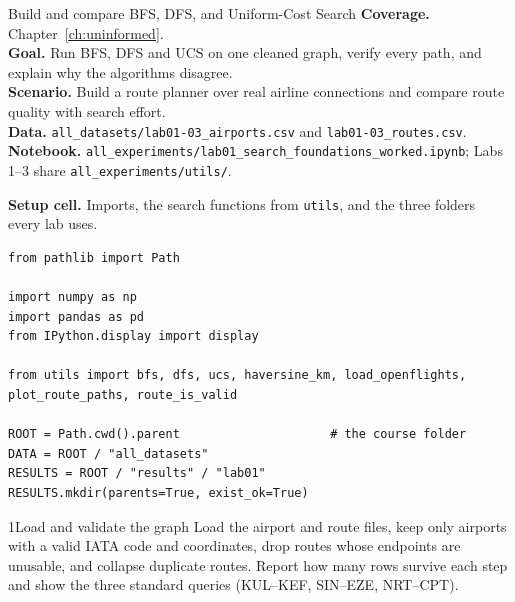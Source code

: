 
\begin{labproject}{Build and compare BFS, DFS, and Uniform-Cost Search}
\textbf{Coverage.} Chapter~\ref{ch:uninformed}.\\
\textbf{Goal.} Run BFS, DFS and UCS on one cleaned graph, verify every path, and explain why the algorithms disagree.\\
\textbf{Scenario.} Build a route planner over real airline connections and compare route quality with search effort.\\
\textbf{Data.} \texttt{all\_datasets/lab01-03\_airports.csv} and \texttt{lab01-03\_routes.csv}.\\
\textbf{Notebook.} \texttt{all\_experiments/lab01\_search\_foundations\_worked.ipynb}; Labs 1--3 share \texttt{all\_experiments/utils/}.
\end{labproject}

\noindent\textbf{Setup cell.} Imports, the search functions from \texttt{utils}, and the three folders every lab uses.
\begin{lstlisting}[style=utppython]
from pathlib import Path

import numpy as np
import pandas as pd
from IPython.display import display

from utils import bfs, dfs, ucs, haversine_km, load_openflights, plot_route_paths, route_is_valid

ROOT = Path.cwd().parent                     # the course folder
DATA = ROOT / "all_datasets"
RESULTS = ROOT / "results" / "lab01"
RESULTS.mkdir(parents=True, exist_ok=True)
\end{lstlisting}

\begin{labquestion}{1}{Load and validate the graph}
Load the airport and route files, keep only airports with a valid IATA code and coordinates, drop routes whose endpoints are unusable, and collapse duplicate routes. Report how many rows survive each step and show the three standard queries (KUL--KEF, SIN--EZE, NRT--CPT).
\end{labquestion}

